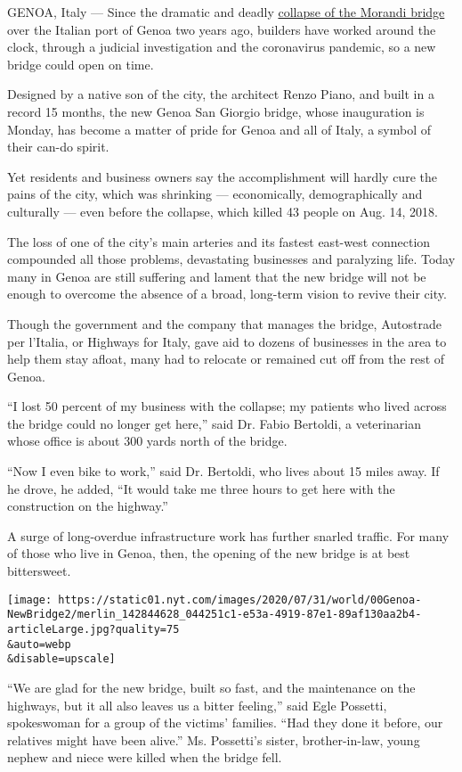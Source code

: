 GENOA, Italy --- Since the dramatic and deadly
\href{https://www.nytimes.com/2018/08/14/world/europe/italy-genoa-bridge-collapse.html}{collapse
of the Morandi bridge} over the Italian port of Genoa two years ago,
builders have worked around the clock, through a judicial investigation
and the coronavirus pandemic, so a new bridge could open on time.

Designed by a native son of the city, the architect Renzo Piano, and
built in a record 15 months, the new Genoa San Giorgio bridge, whose
inauguration is Monday, has become a matter of pride for Genoa and all
of Italy, a symbol of their can-do spirit.

Yet residents and business owners say the accomplishment will hardly
cure the pains of the city, which was shrinking --- economically,
demographically and culturally --- even before the collapse, which
killed 43 people on Aug. 14, 2018.

The loss of one of the city's main arteries and its fastest east-west
connection compounded all those problems, devastating businesses and
paralyzing life. Today many in Genoa are still suffering and lament that
the new bridge will not be enough to overcome the absence of a broad,
long-term vision to revive their city.

Though the government and the company that manages the bridge,
Autostrade per l'Italia, or Highways for Italy, gave aid to dozens of
businesses in the area to help them stay afloat, many had to relocate or
remained cut off from the rest of Genoa.

``I lost 50 percent of my business with the collapse; my patients who
lived across the bridge could no longer get here,'' said Dr. Fabio
Bertoldi, a veterinarian whose office is about 300 yards north of the
bridge.

``Now I even bike to work,'' said Dr. Bertoldi, who lives about 15 miles
away. If he drove, he added, ``It would take me three hours to get here
with the construction on the highway.''

A surge of long-overdue infrastructure work has further snarled traffic.
For many of those who live in Genoa, then, the opening of the new bridge
is at best bittersweet.

\texttt{[image: https://static01.nyt.com/images/2020/07/31/world/00Genoa-NewBridge2/merlin\_142844628\_044251c1-e53a-4919-87e1-89af130aa2b4-articleLarge.jpg?quality=75\\\&auto=webp\\\&disable=upscale]}

``We are glad for the new bridge, built so fast, and the maintenance on
the highways, but it all also leaves us a bitter feeling,'' said Egle
Possetti, spokeswoman for a group of the victims' families. ``Had they
done it before, our relatives might have been alive.'' Ms. Possetti's
sister, brother-in-law, young nephew and niece were killed when the
bridge fell.

